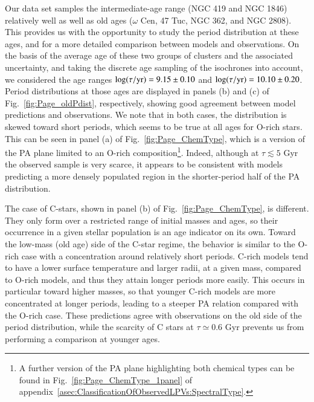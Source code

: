 \documentclass[letter]{aa}
\newcommand{\logAge}{\log(\tau / {\rm yr})}
\begin{document}
Our data set samples the intermediate-age range (NGC 419 and NGC 1846) relatively well as well as old ages ($\omega$ Cen, 47 Tuc, NGC 362, and NGC 2808). This provides us with the opportunity to study the period distribution at these ages, and for a more detailed comparison between models and observations. On the basis of the average age of these two groups of clusters and the associated uncertainty, and taking the discrete age sampling of the isochrones into account, we considered the age ranges $\logAge=9.15\pm0.10$ and $\logAge=10.10\pm0.20$. Period distributions at those ages are displayed in panels (b) and (c) of Fig.~\ref{fig:Page_oldPdist}, respectively, showing good agreement between model predictions and observations. We note that in both cases, the distribution is skewed toward short periods, which seems to be true at all ages for O-rich stars. This can be seen in panel (a) of Fig.~\ref{fig:Page_ChemType}, which is a version of the PA plane limited to an O-rich composition\footnote{
    A further version of the PA plane highlighting both chemical types can be found in Fig.~\ref{fig:Page_ChemType_1panel} of appendix~\ref{asec:ClassificationOfObservedLPVs:SpectralType}.
}. Indeed, although at $\tau\lesssim5$ Gyr the observed sample is very scarce, it appears to be consistent with models predicting a more densely populated region in the shorter-period half of the PA distribution.

The case of C-stars, shown in panel (b) of Fig.~\ref{fig:Page_ChemType}, is different. They only form over a restricted range of initial masses and ages, so their occurrence in a given stellar population is an age indicator on its own. Toward the low-mass (old age) side of the C-star regime, the behavior is similar to the O-rich case with a concentration around relatively short periods. C-rich models tend to have a lower surface temperature and larger radii, at a given mass, compared to O-rich models, and thus they attain longer periods more easily. This occurs in particular toward higher masses, so that younger C-rich models are more concentrated at longer periods, leading to a steeper PA relation compared with the O-rich case. These predictions agree with observations on the old side of the period distribution, while the scarcity of C stars at $\tau\simeq0.6$ Gyr prevents us from performing a comparison at younger ages.
\end{document}
